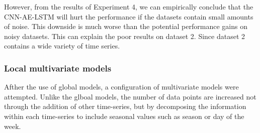 However, from the results of Experiment 4, we can empirically conclude that the CNN-AE-LSTM will
hurt the performance if the datasets contain small amounts of noise. This downside is much
worse than the potential performance gains on noisy datasets.
This can explain the poor results on dataset 2. Since dataset 2 contains a wide variety
of time series.




%
%





\subsubsection{Local multivariate models}

Afther the use of global models, a configuration of multivariate models were attempted.
Unlike the glboal models,
the number of data points are increased not through the addition of other time-series,
but by decomposing the information within each time-series to include seasonal values such as season or day of the week.

